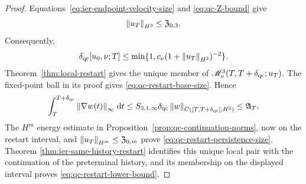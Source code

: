 \begin{proof}
Equations~\eqref{eq:ier-endpoint-velocity-size} and
\eqref{eq:qc-Z-bound} give
\[
 \left\lVert u_T\right\rVert_{H^3}\le\mathfrak Z_{0,3}.
\]
Consequently,
\[
 \delta_{\rm qc}[u_0,\nu;T]
 \le\min\{1,c_\nu(1+\left\lVert u_T\right\rVert_{H^3})^{-2}\}.
\]
Theorem~\ref{thm:local-restart} gives the unique member of
\(\mathscr M_\nu^3(T,T+\delta_{\rm qc};u_T)\).  The fixed-point ball in its
proof gives
\eqref{eq:qc-restart-base-size}.  Hence
\[
 \int_T^{T+\delta_{\rm qc}}\left\lVert \nabla w(t)\right\rVert_\infty\,\mathrm d t
 \le S_{3,1,\infty}\delta_{\rm qc}
 \left\lVert w\right\rVert_{C([T,T+\delta_{\rm qc}];H^3)}
 \le\mathfrak A_T.
\]
The \(H^m\) energy estimate in
Proposition~\ref{prop:qc-continuation-norms}, now on the restart interval,
and \(\left\lVert u_T\right\rVert_{H^m}\le\mathfrak Z_{0,m}\) prove
\eqref{eq:qc-restart-persistence-size}.  Theorem
\ref{thm:ier-same-history-restart} identifies this unique local pair with the
continuation of the preterminal history, and its membership on the displayed
interval proves \eqref{eq:qc-restart-lower-bound}.
\end{proof}

